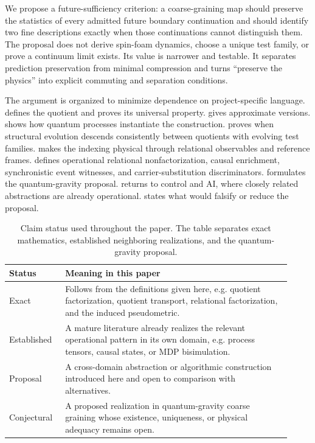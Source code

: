\documentclass[11pt]{article}
\begin{document}
We propose a future-sufficiency criterion: a coarse-graining map should preserve the statistics of every admitted future boundary continuation and should identify two fine descriptions exactly when those continuations cannot distinguish them. The proposal does not derive spin-foam dynamics, choose a unique test family, or prove a continuum limit exists. Its value is narrower and testable. It separates prediction preservation from minimal compression and turns ``preserve the physics'' into explicit commuting and separation conditions.

The argument is organized to minimize dependence on project-specific language.  defines the quotient and proves its universal property.  gives approximate versions.  shows how quantum processes instantiate the construction.  proves when structural evolution descends consistently between quotients with evolving test families.  makes the indexing physical through relational observables and reference frames.  defines operational relational nonfactorization, causal enrichment, synchronistic event witnesses, and carrier-substitution discriminators.  formulates the quantum-gravity proposal.  returns to control and AI, where closely related abstractions are already operational.  states what would falsify or reduce the proposal.

\begin{table}[t]
\caption{Claim status used throughout the paper. The table separates exact mathematics, established neighboring realizations, and the quantum-gravity proposal.}
\label{tab:claim-status}
\centering
\small
\begin{tabular}{p{0.18\linewidth}p{0.74\linewidth}}
\toprule
Status & Meaning in this paper \\
\midrule
Exact & Follows from the definitions given here, e.g. quotient factorization, quotient transport, relational factorization, and the induced pseudometric. \\
Established & A mature literature already realizes the relevant operational pattern in its own domain, e.g. process tensors, causal states, or MDP bisimulation. \\
Proposal & A cross-domain abstraction or algorithmic construction introduced here and open to comparison with alternatives. \\
Conjectural & A proposed realization in quantum-gravity coarse graining whose existence, uniqueness, or physical adequacy remains open. \\
\bottomrule
\end{tabular}
\end{table}
\end{document}
